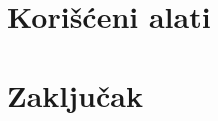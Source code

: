 \documentclass[a4paper]{article}
\begin{document}
\section{Kori\v{s}\'c{}eni alati}
\label{sec:Alati}

\cite{KNIME}
\cite{SPSS}


\section{Zaključak}
\label{sec:Zakljucak}



\appendix



\end{document}
